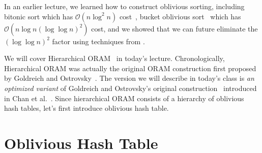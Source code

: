 \newcommand{\rsmpl}{\xleftarrow{\$}}

\newcommand{\alg}{\textsc{Alg}}

\newcommand{\ap}{\textsc{AccessPattern}}
\newtheorem{nonexample}[theorem]{Non-Example}


In an earlier lecture, we learned how to construct oblivious sorting, including bitonic sort which has $\mathcal{O}(n \log^2 n)$ cost~\cite{Batcher}, bucket oblivious sort~\cite{bucket} which has $\mathcal{O}(n \log n (\log \log n)^2)$ cost, 
and we showed that we can future eliminate the $(\log \log n)^2$ factor using
techniques from 
\cite{domulticore, tianyao-sort}.

We will cover Hierarchical ORAM~\cite{10.1145/233551.233553} 
in today's lecture.
Chronologically, 
Hierarchical ORAM 
was actually the original ORAM construction  
first proposed by Goldreich and Ostrovsky~\cite{10.1145/233551.233553}. 
The version we will describe in today's class
is {\it an optimized variant} of Goldreich and Ostrovsky's original
construction~\cite{10.1145/233551.233553}
introduced in Chan et al.~\cite{ohash}.
Since hierarchical ORAM consists of a hierarchy of oblivious hash tables,
let's first introduce oblivious hash table.

\section{Oblivious Hash Table}

